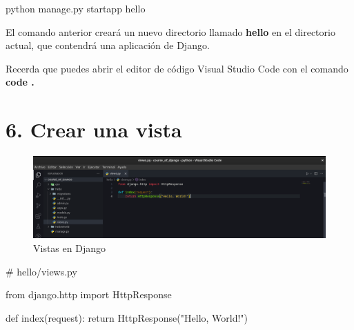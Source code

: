 \documentclass[
  a4paper,
  DIV=11,
  numbers=noendperiod,
  onepage,
  openany]{scrreprt}
\newenvironment{Shaded}{\begin{snugshade}}{\end{snugshade}}
\newcommand{\CommentTok}[1]{\textcolor[rgb]{0.37,0.37,0.37}{#1}}
\newcommand{\ControlFlowTok}[1]{\textcolor[rgb]{0.00,0.23,0.31}{#1}}
\newcommand{\ExtensionTok}[1]{\textcolor[rgb]{0.00,0.23,0.31}{#1}}
\newcommand{\ImportTok}[1]{\textcolor[rgb]{0.00,0.46,0.62}{#1}}
\newcommand{\KeywordTok}[1]{\textcolor[rgb]{0.00,0.23,0.31}{#1}}
\newcommand{\NormalTok}[1]{\textcolor[rgb]{0.00,0.23,0.31}{#1}}
\newcommand{\StringTok}[1]{\textcolor[rgb]{0.13,0.47,0.30}{#1}}
\begin{document}
\begin{Shaded}
\begin{Highlighting}[]
\ExtensionTok{python}\NormalTok{ manage.py startapp hello}
\end{Highlighting}
\end{Shaded}

El comando anterior creará un nuevo directorio llamado \textbf{hello} en
el directorio actual, que contendrá una aplicación de Django.

\begin{tcolorbox}[enhanced jigsaw, title=\textcolor{quarto-callout-tip-color}{\faLightbulb}\hspace{0.5em}{Tip}, colback=white, rightrule=.15mm, opacityback=0, colframe=quarto-callout-tip-color-frame, titlerule=0mm, opacitybacktitle=0.6, breakable, coltitle=black, colbacktitle=quarto-callout-tip-color!10!white, bottomtitle=1mm, toptitle=1mm, left=2mm, arc=.35mm, toprule=.15mm, leftrule=.75mm, bottomrule=.15mm]

Recerda que puedes abrir el editor de código Visual Studio Code con el
comando \textbf{code .}

\end{tcolorbox}

\section{6. Crear una vista}\label{crear-una-vista}

\begin{figure}[H]

{\centering \includegraphics{images/views_hello.png}

}

\caption{Vistas en Django}

\end{figure}%

\begin{Shaded}
\begin{Highlighting}[]
\CommentTok{\# hello/views.py}

\ImportTok{from}\NormalTok{ django.http }\ImportTok{import}\NormalTok{ HttpResponse}

\KeywordTok{def}\NormalTok{ index(request):}
    \ControlFlowTok{return}\NormalTok{ HttpResponse(}\StringTok{"Hello, World!"}\NormalTok{)}
\end{Highlighting}
\end{Shaded}
\end{document}
